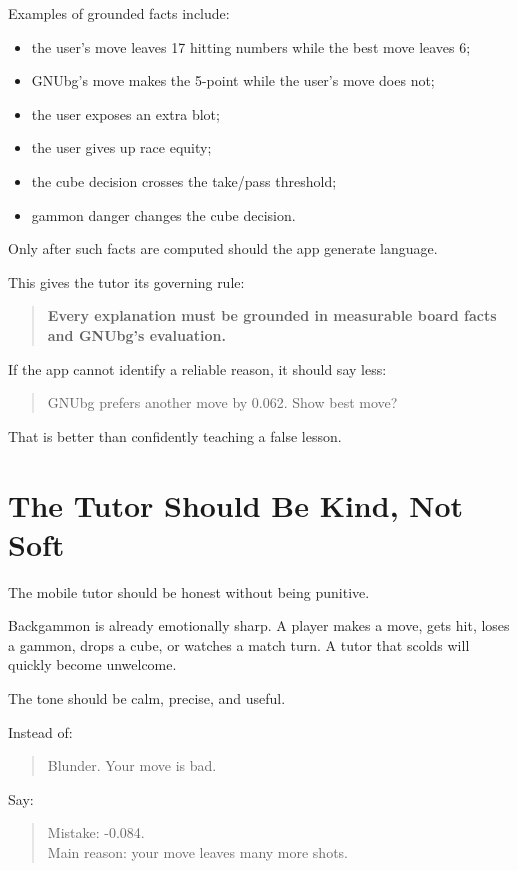 \documentclass[11pt,a4paper]{article}
\begin{document}
Examples of grounded facts include:

\begin{itemize}
  \item the user's move leaves 17 hitting numbers while the best move leaves 6;
  \item GNUbg's move makes the 5-point while the user's move does not;
  \item the user exposes an extra blot;
  \item the user gives up race equity;
  \item the cube decision crosses the take/pass threshold;
  \item gammon danger changes the cube decision.
\end{itemize}

Only after such facts are computed should the app generate language.

This gives the tutor its governing rule:

\begin{quote}
\textbf{Every explanation must be grounded in measurable board facts and GNUbg's evaluation.}
\end{quote}

If the app cannot identify a reliable reason, it should say less:

\begin{quote}
GNUbg prefers another move by 0.062. Show best move?
\end{quote}

That is better than confidently teaching a false lesson.

\section{The Tutor Should Be Kind, Not Soft}

The mobile tutor should be honest without being punitive.

Backgammon is already emotionally sharp. A player makes a move, gets hit, loses a gammon, drops a cube, or watches a match turn. A tutor that scolds will quickly become unwelcome.

The tone should be calm, precise, and useful.

Instead of:

\begin{quote}
Blunder. Your move is bad.
\end{quote}

Say:

\begin{quote}
Mistake: -0.084.\\
Main reason: your move leaves many more shots.
\end{quote}
\end{document}
